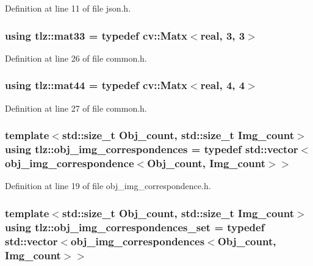 Definition at line 11 of file json.\+h.

\subsubsection[{\texorpdfstring{mat33}{mat33}}]{\setlength{\rightskip}{0pt plus 5cm}using {\bf tlz\+::mat33} = typedef cv\+::\+Matx$<${\bf real}, 3, 3$>$}\hypertarget{namespacetlz_a6679497d5121f319147594e1f344ef57}{}\label{namespacetlz_a6679497d5121f319147594e1f344ef57}


Definition at line 26 of file common.\+h.

\subsubsection[{\texorpdfstring{mat44}{mat44}}]{\setlength{\rightskip}{0pt plus 5cm}using {\bf tlz\+::mat44} = typedef cv\+::\+Matx$<${\bf real}, 4, 4$>$}\hypertarget{namespacetlz_a56693a40f2ef608241dddb9064281089}{}\label{namespacetlz_a56693a40f2ef608241dddb9064281089}


Definition at line 27 of file common.\+h.

\subsubsection[{\texorpdfstring{obj\+\_\+img\+\_\+correspondences}{obj_img_correspondences}}]{\setlength{\rightskip}{0pt plus 5cm}template$<$std\+::size\+\_\+t Obj\+\_\+count, std\+::size\+\_\+t Img\+\_\+count$>$ using {\bf tlz\+::obj\+\_\+img\+\_\+correspondences} = typedef std\+::vector$<${\bf obj\+\_\+img\+\_\+correspondence}$<$Obj\+\_\+count, Img\+\_\+count$>$$>$}\hypertarget{namespacetlz_a59fe514deacf47a3f4a14450a3752725}{}\label{namespacetlz_a59fe514deacf47a3f4a14450a3752725}


Definition at line 19 of file obj\+\_\+img\+\_\+correspondence.\+h.

\subsubsection[{\texorpdfstring{obj\+\_\+img\+\_\+correspondences\+\_\+set}{obj_img_correspondences_set}}]{\setlength{\rightskip}{0pt plus 5cm}template$<$std\+::size\+\_\+t Obj\+\_\+count, std\+::size\+\_\+t Img\+\_\+count$>$ using {\bf tlz\+::obj\+\_\+img\+\_\+correspondences\+\_\+set} = typedef std\+::vector$<${\bf obj\+\_\+img\+\_\+correspondences}$<$Obj\+\_\+count, Img\+\_\+count$>$$>$}\hypertarget{namespacetlz_a3dec48786e0f39d39c096eb127945c27}{}\label{namespacetlz_a3dec48786e0f39d39c096eb127945c27}


